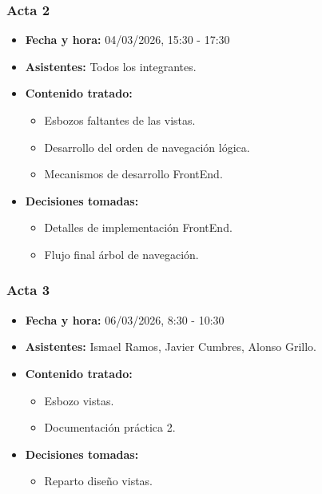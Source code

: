 \documentclass[12pt,a4paper]{article}
\begin{document}
\subsubsection{Acta 2}
\begin{itemize}
    \item \textbf{Fecha y hora: } 04/03/2026, 15:30 - 17:30
    \item \textbf{Asistentes: } Todos los integrantes.
    \item \textbf{Contenido tratado: }
    \begin{itemize}
        \item [\tiny$\blacksquare$] Esbozos faltantes de las vistas.
        \item [\tiny$\blacksquare$] Desarrollo del orden de navegación lógica.
        \item [\tiny$\blacksquare$] Mecanismos de desarrollo FrontEnd.
    \end{itemize}
    \item \textbf{Decisiones tomadas: }
    \begin{itemize}
        \item [\tiny$\blacksquare$] Detalles de implementación FrontEnd.
        \item [\tiny$\blacksquare$] Flujo final árbol de navegación.
    \end{itemize}
\end{itemize}

\subsubsection{Acta 3}
\begin{itemize}
    \item \textbf{Fecha y hora: } 06/03/2026, 8:30 - 10:30
    \item \textbf{Asistentes: } Ismael Ramos, Javier Cumbres, Alonso Grillo.
    \item \textbf{Contenido tratado: }
    \begin{itemize}
        \item [\tiny$\blacksquare$] Esbozo vistas.
        \item [\tiny$\blacksquare$] Documentación práctica 2.
    \end{itemize}
    \item \textbf{Decisiones tomadas: }
    \begin{itemize}
        \item [\tiny$\blacksquare$] Reparto diseño vistas.
    \end{itemize}
\end{itemize}
\end{document}
